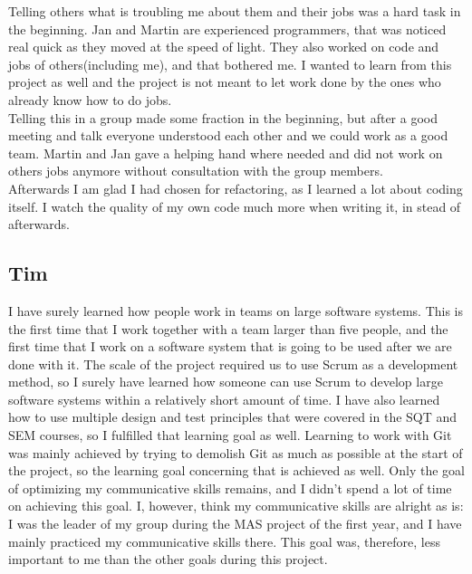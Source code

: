 \documentclass{article}
\begin{document}
\begin{enumerate}
\begin{itemize}
Telling others what is troubling me about them and their jobs was a hard task in the beginning. Jan and Martin are experienced programmers, that was noticed real quick as they moved at the speed of light. They also worked on code and jobs of others(including me), and that bothered me. I wanted to learn from this project as well and the project is not meant to let work done by the ones who already know how to do jobs.\\
Telling this in a group made some fraction in the beginning, but after a good meeting and talk everyone understood each other and we could work as a good team. Martin and Jan gave a helping hand where needed and did not work on others jobs anymore without consultation with the group members.\\
Afterwards I am glad I had chosen for refactoring, as I learned a lot about coding itself. I watch the quality of my own code much more when writing it, in stead of afterwards.

\subsection*{Tim}
I have surely learned how people work in teams on large software systems. This is the first time that I work together with a team larger than five people, and the first time that I work on a software system that is going to be used after we are done with it. The scale of the project required us to use Scrum as a development method, so I surely have learned how someone can use Scrum to develop large software systems within a relatively short amount of time. I have also learned how to use multiple design and test principles that were covered in the SQT and SEM courses, so I fulfilled that learning goal as well. Learning to work with Git was mainly achieved by trying to demolish Git as much as possible at the start of the project, so the learning goal concerning that is achieved as well. Only the goal of optimizing my communicative skills remains, and I didn't spend a lot of time on achieving this goal. I, however, think my communicative skills are alright as is: I was the leader of my group during the MAS project of the first year, and I have mainly practiced my communicative skills there. This goal was, therefore, less important to me than the other goals during this project. 


\end{itemize}
\end{enumerate}
\end{document}
